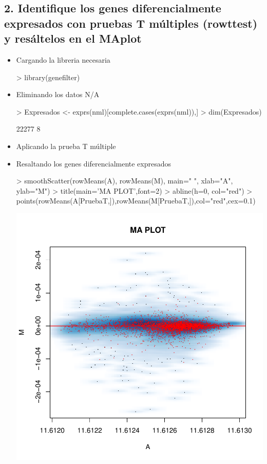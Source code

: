 \documentclass[12pt]{article}
\begin{document}
\subsection*{2. Identifique los genes diferencialmente expresados con pruebas T múltiples (rowttest) y resáltelos en el MAplot}

\begin{itemize}
\item{Cargando la libreria necesaria}
\begin{Schunk}
\begin{Sinput}
> library(genefilter)
\end{Sinput}
\end{Schunk}
\item{Eliminando los datos N/A}
\begin{Schunk}
\begin{Sinput}
> Expresados <- exprs(nml)[complete.cases(exprs(nml)),]
> dim(Expresados)
\end{Sinput}
\begin{Soutput}
[1] 22277     8
\end{Soutput}
\end{Schunk}
\item{Aplicando la prueba T múltiple}
\begin{Schunk}
\end{Schunk}
\item{Resaltando los genes diferencialmente expresados}
\begin{Schunk}
\begin{Sinput}
> smoothScatter(rowMeans(A), rowMeans(M), main=" ", xlab="A", ylab="M")
> title(main='MA PLOT',font=2)
> abline(h=0, col="red")
> points(rowMeans(A[PruebaT,]),rowMeans(M[PruebaT,]),col="red",cex=0.1)
\end{Sinput}
\end{Schunk}
\includegraphics{JuanHenao_Taller3-011}
\end{itemize}
\end{document}
